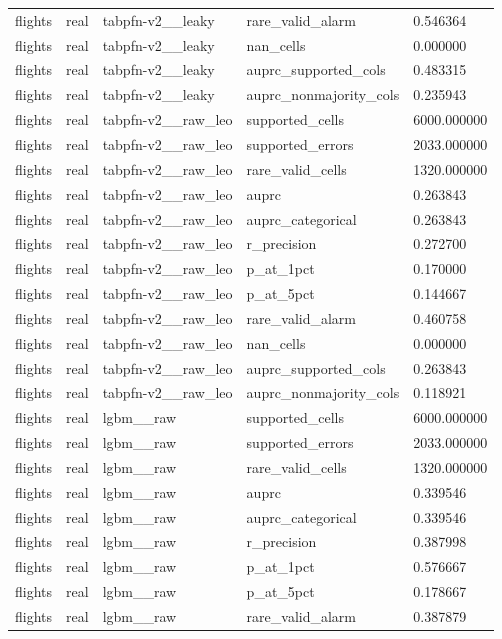 \begin{tabular}{lllll}
flights & real & tabpfn-v2\_\_leaky & rare\_valid\_alarm & 0.546364 \\
flights & real & tabpfn-v2\_\_leaky & nan\_cells & 0.000000 \\
flights & real & tabpfn-v2\_\_leaky & auprc\_supported\_cols & 0.483315 \\
flights & real & tabpfn-v2\_\_leaky & auprc\_nonmajority\_cols & 0.235943 \\
flights & real & tabpfn-v2\_\_raw\_leo & supported\_cells & 6000.000000 \\
flights & real & tabpfn-v2\_\_raw\_leo & supported\_errors & 2033.000000 \\
flights & real & tabpfn-v2\_\_raw\_leo & rare\_valid\_cells & 1320.000000 \\
flights & real & tabpfn-v2\_\_raw\_leo & auprc & 0.263843 \\
flights & real & tabpfn-v2\_\_raw\_leo & auprc\_categorical & 0.263843 \\
flights & real & tabpfn-v2\_\_raw\_leo & r\_precision & 0.272700 \\
flights & real & tabpfn-v2\_\_raw\_leo & p\_at\_1pct & 0.170000 \\
flights & real & tabpfn-v2\_\_raw\_leo & p\_at\_5pct & 0.144667 \\
flights & real & tabpfn-v2\_\_raw\_leo & rare\_valid\_alarm & 0.460758 \\
flights & real & tabpfn-v2\_\_raw\_leo & nan\_cells & 0.000000 \\
flights & real & tabpfn-v2\_\_raw\_leo & auprc\_supported\_cols & 0.263843 \\
flights & real & tabpfn-v2\_\_raw\_leo & auprc\_nonmajority\_cols & 0.118921 \\
flights & real & lgbm\_\_raw & supported\_cells & 6000.000000 \\
flights & real & lgbm\_\_raw & supported\_errors & 2033.000000 \\
flights & real & lgbm\_\_raw & rare\_valid\_cells & 1320.000000 \\
flights & real & lgbm\_\_raw & auprc & 0.339546 \\
flights & real & lgbm\_\_raw & auprc\_categorical & 0.339546 \\
flights & real & lgbm\_\_raw & r\_precision & 0.387998 \\
flights & real & lgbm\_\_raw & p\_at\_1pct & 0.576667 \\
flights & real & lgbm\_\_raw & p\_at\_5pct & 0.178667 \\
flights & real & lgbm\_\_raw & rare\_valid\_alarm & 0.387879 \\

\end{tabular}
